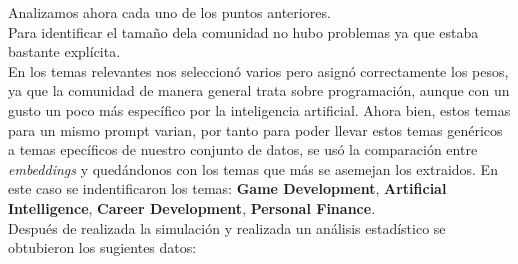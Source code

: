 \documentclass[acmtog]{acmart}
\begin{document}
Analizamos ahora cada uno de los puntos anteriores. 
\\
Para identificar el tamaño dela comunidad no  hubo problemas ya que estaba bastante explícita.
\\
En los temas relevantes nos seleccionó varios pero asignó correctamente los pesos, ya que la comunidad de manera general trata sobre programación, aunque con un gusto un poco más específico por la inteligencia artificial. 
Ahora bien, estos temas para un mismo prompt varian, por tanto para poder llevar estos temas genéricos a temas epecíficos de nuestro conjunto de datos, se usó la comparación entre \textit{embeddings} y quedándonos con los temas que más
se asemejan los extraidos. En este caso se indentificaron los temas: \textbf{Game Development}, \textbf{Artificial Intelligence}, \textbf{Career Development}, \textbf{Personal Finance}.
\\
Después de realizada la simulación y realizada un análisis estadístico se obtubieron los sugientes datos:

\end{document}
